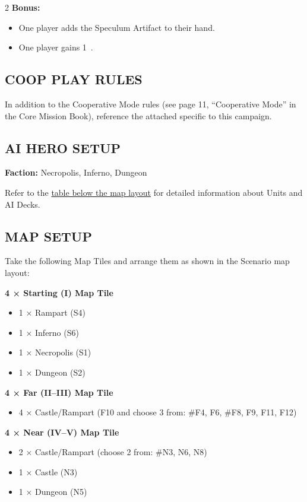 \begin{multicols*}{2}
\columnbreak
\textbf{Bonus:}
\begin{itemize}
  \item One player adds the Speculum Artifact to their hand.
  \item One player gains 1~.
\end{itemize}

\subsection*{\MakeUppercase{Coop Play Rules}}

In addition to the Cooperative Mode rules (see page 11, ``Cooperative Mode'' in the Core Mission Book), reference the attached  specific to this campaign.

\subsection*{\MakeUppercase{AI Hero Setup}}

\textbf{Faction:} Necropolis, Inferno, Dungeon

Refer to the \hyperlink{Elixir of Life AI}{table below the map layout} for detailed information about Units and AI Decks.

\subsection*{\MakeUppercase{Map Setup}}

Take the following Map Tiles and arrange them as shown in the Scenario map layout:

\textbf{4 × Starting (I) Map Tile}
\begin{itemize}
  \item 1 × Rampart (S4)
  \item 1 × Inferno (S6)
  \item 1 × Necropolis (S1)
  \item 1 × Dungeon (S2)
\end{itemize}

\textbf{4 × Far (II--III) Map Tile}
\begin{itemize}
  \item 4 × Castle/Rampart (F10 and choose 3 from: \#F4, F6, \#F8, F9, F11, F12)
\end{itemize}

\textbf{4 × Near (IV--V) Map Tile}
\begin{itemize}
  \item 2 × Castle/Rampart (choose 2 from: \#N3, N6, N8)
  \item 1 × Castle (N3)
  \item 1 × Dungeon (N5)
\end{itemize}


\end{multicols*}
